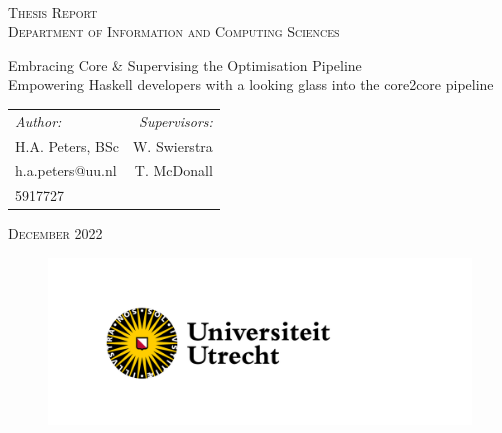 \documentclass{report}
\begin{document}
\begin{titlepage}
    \centering
    
    \\
    \vspace{5em}
    \textsc{\Large{Thesis Report}}\\
    \vspace{2em}
    \textsc{\large{Department of Information and Computing Sciences}}\\
    
    \vspace{3em}
    \hrulefill
    \vspace{4em}
    
    \huge{Embracing Core \& Supervising the Optimisation Pipeline}\\
    \vspace{1em}
    \Large{Empowering Haskell developers with a looking glass into the core2core pipeline}

    \vspace{4em}
    \hrulefill
    \vspace{3em}
   
    \begin{tabular}{p{}r}
        \textit{Author:} & \textit{Supervisors:}\\
        H.A. Peters, BSc & W. Swierstra\\
        h.a.peters@uu.nl & T. McDonall\\
        5917727 &
    \end{tabular}
    
    \vspace{3em}
    \textsc{December 2022}\\
    
    \begin{figure}[b]
        \hspace{-1.25cm}
        \includegraphics{figs/UU_logo_2021_NL_RGB.png}
    \end{figure}
    
\end{titlepage}
\end{document}
